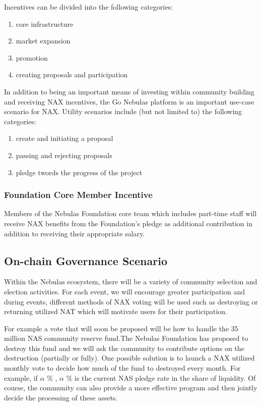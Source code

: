 Incentives can be divided into the following categories:
\begin{enumerate}[\hspace{1cm}(a)]
	\item core infrastructure
	\item market expansion
	\item promotion
	\item creating proposals and participation
\end{enumerate}

In addition to being an important means of investing within community building and receiving NAX incentives, the Go Nebulas platform is an important use-case scenario for NAX. Utility scenarios include (but not limited to) the following categories:
\begin{enumerate}[\hspace{1cm}(a)]
	\item create and initiating a proposal
	\item passing and rejecting proposals
	\item pledge twords the progress of the project
\end{enumerate}

\subsubsection{Foundation Core Member Incentive}
Members of the Nebulas Foundation core team which includes part-time staff will receive NAX benefits from the Foundation's pledge as additional contribution in addition to receiving their appropriate salary.

\subsection{On-chain Governance Scenario}
Within the Nebulas ecosystem, there will be a variety of community selection and election activities. For each event, we will encourage greater participation and during events, different methods of NAX voting will be used such as destroying or returning utilized NAT which will motivate users for their participation.

For example a vote that will soon be proposed will be how to handle the 35 million NAS community reserve fund.The Nebulas Foundation has proposed to destroy this fund and we will ask the community to contribute options on the destruction (partially or fully). One possible solution is to launch a NAX utilized monthly vote to decide how much of the fund to destroyed every month. For example, if \(\alpha\) \% , \(\alpha\) \% is the current NAS pledge rate in the share of liquidity. Of course, the community can also provide a more effective program and then jointly decide the processing of these assets.

